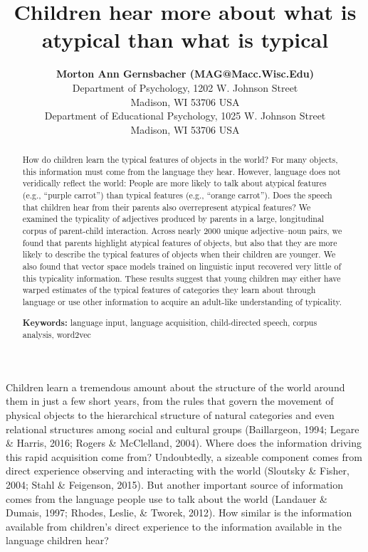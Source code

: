 \documentclass[10pt, letterpaper]{article}
\title{Children hear more about what is atypical than what is typical}
\author{{\large \bf Morton Ann Gernsbacher (MAG@Macc.Wisc.Edu)} \\ Department of Psychology, 1202 W. Johnson Street \\ Madison, WI 53706 USA \AND {\large \bf Sharon J.~Derry (SDJ@Macc.Wisc.Edu)} \\ Department of Educational Psychology, 1025 W. Johnson Street \\ Madison, WI 53706 USA}
\begin{document}
\maketitle

\begin{abstract}
How do children learn the typical features of objects in the world? For
many objects, this information must come from the language they hear.
However, language does not veridically reflect the world: People are
more likely to talk about atypical features (e.g., ``purple carrot'')
than typical features (e.g., ``orange carrot''). Does the speech that
children hear from their parents also overrepresent atypical features?
We examined the typicality of adjectives produced by parents in a large,
longitudinal corpus of parent-child interaction. Across nearly 2000
unique adjective--noun pairs, we found that parents highlight atypical
features of objects, but also that they are more likely to describe the
typical features of objects when their children are younger. We also
found that vector space models trained on linguistic input recovered
very little of this typicality information. These results suggest that
young children may either have warped estimates of the typical features
of categories they learn about through language or use other information
to acquire an adult-like understanding of typicality.

\textbf{Keywords:}
language input, language acquisition, child-directed speech, corpus
analysis, word2vec
\end{abstract}

Children learn a tremendous amount about the structure of the world
around them in just a few short years, from the rules that govern the
movement of physical objects to the hierarchical structure of natural
categories and even relational structures among social and cultural
groups (Baillargeon, 1994; Legare \& Harris, 2016; Rogers \& McClelland,
2004). Where does the information driving this rapid acquisition come
from? Undoubtedly, a sizeable component comes from direct experience
observing and interacting with the world (Sloutsky \& Fisher, 2004;
Stahl \& Feigenson, 2015). But another important source of information
comes from the language people use to talk about the world (Landauer \&
Dumais, 1997; Rhodes, Leslie, \& Tworek, 2012). How similar is the
information available from children's direct experience to the
information available in the language children hear?
\end{document}

